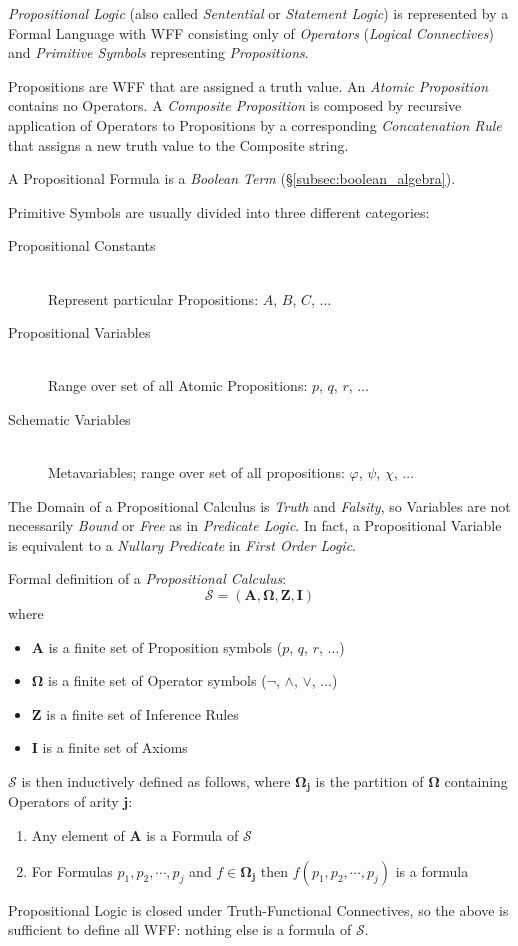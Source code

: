 \documentclass{article}
\begin{document}
\emph{Propositional Logic} (also called \emph{Sentential} or
\emph{Statement Logic}) is represented by a Formal Language with WFF
consisting only of \emph{Operators} (\emph{Logical Connectives}) and
\emph{Primitive Symbols} representing \emph{Propositions}.

Propositions are WFF that are assigned a truth value. An \emph{Atomic
  Proposition} contains no Operators. A \emph{Composite Proposition}
is composed by recursive application of Operators to Propositions by a
corresponding \emph{Concatenation Rule} that assigns a new truth value
to the Composite string.

A Propositional Formula is a \emph{Boolean Term}
(\S\ref{subsec:boolean_algebra}).

Primitive Symbols are usually divided into three different categories:
\begin{description}
\item[Propositional Constants] \hfill \\
Represent particular Propositions: $A$, $B$, $C$, $\ldots$
\item[Propositional Variables] \hfill \\
Range over set of all Atomic Propositions: $p$, $q$, $r$, $\ldots$
\item[Schematic Variables] \hfill \\
Metavariables; range over set of all propositions: $\varphi$, $\psi$,
$\chi$, $\ldots$
\end{description}

The Domain of a Propositional Calculus is \emph{Truth} and
\emph{Falsity}, so Variables are not necessarily \emph{Bound} or
\emph{Free} as in \emph{Predicate Logic}. In fact, a Propositional
Variable is equivalent to a \emph{Nullary Predicate} in \emph{First
  Order Logic}.

Formal definition of a \emph{Propositional Calculus}:
\[
    \mathcal{S} = (\mathbf{A},\mathbf{\Omega},\mathbf{Z},\mathbf{I})
\]
where
\begin{itemize}
\item $\mathbf{A}$ is a finite set of Proposition symbols ($p$, $q$,
  $r$, $\ldots$)
\item $\mathbf{\Omega}$ is a finite set of Operator symbols ($\neg$,
  $\wedge$, $\vee$, $\ldots$)
\item $\mathbf{Z}$ is a finite set of Inference Rules
\item $\mathbf{I}$ is a finite set of Axioms
\end{itemize}
$\mathcal{S}$ is then inductively defined as follows, where
$\mathbf{\Omega_j}$ is the partition of $\mathbf{\Omega}$ containing
Operators of arity $\mathbf{j}$:
\begin{enumerate}
\item Any element of $\mathbf{A}$ is a Formula of $\mathcal{S}$
\item For Formulas $p_1, p_2, \cdots, p_j$ and $f \in
  \mathbf{\Omega_j}$ then $f(p_1, p_2, \cdots, p_j)$ is a formula
\end{enumerate}
Propositional Logic is closed under Truth-Functional Connectives, so
the above is sufficient to define all WFF: nothing else is a formula
of $\mathcal{S}$.
\end{document}
